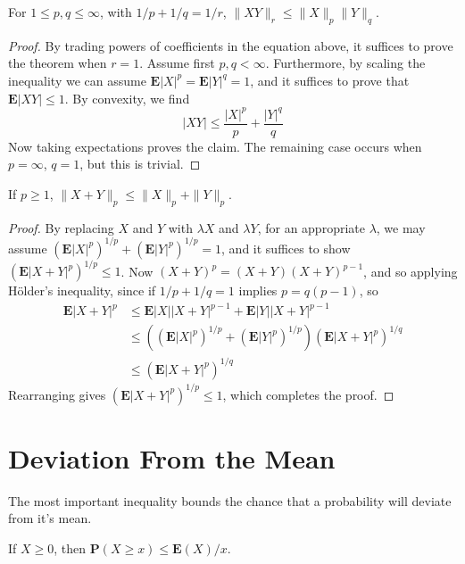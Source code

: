 \begin{corollary}
    For $1 \leq p,q \leq \infty$, with $1/p + 1/q = 1/r$, $\| XY \|_r \leq \| X \|_p \| Y \|_q$.
\end{corollary}
\begin{proof}
    By trading powers of coefficients in the equation above, it suffices to prove the theorem when $r = 1$. Assume first $p,q < \infty$. Furthermore, by scaling the inequality we can assume $\mathbf{E}|X|^p = \mathbf{E}|Y|^q = 1$, and it suffices to prove that $\mathbf{E}|XY| \leq 1$. By convexity, we find
    \[ |XY| \leq \frac{|X|^p}{p} + \frac{|Y|^q}{q} \]
    Now taking expectations proves the claim. The remaining case occurs when $p = \infty$, $q = 1$, but this is trivial.
\end{proof}

\begin{corollary}
    If $p \geq 1$, $\|X+Y\|_p \leq \|X\|_p + \|Y\|_p$.
\end{corollary}
\begin{proof}
    By replacing $X$ and $Y$ with $\lambda X$ and $\lambda Y$, for an appropriate $\lambda$, we may assume $(\mathbf{E} |X|^p)^{1/p} + (\mathbf{E} |Y|^p)^{1/p} = 1$, and it suffices to show $(\mathbf{E} |X+Y|^p)^{1/p} \leq 1$. Now $(X+Y)^p = (X+Y) (X+Y)^{p-1}$, and so applying H\"{o}lder's inequality, since if $1/p + 1/q = 1$ implies $p = q(p-1)$, so
    \begin{align*}
        \mathbf{E} |X+Y|^p &\leq \mathbf{E} |X||X+Y|^{p-1} + \mathbf{E} |Y||X+Y|^{p-1}\\
        &\leq ((\mathbf{E} |X|^p)^{1/p} + (\mathbf{E} |Y|^p)^{1/p}) (\mathbf{E} |X+Y|^{p})^{1/q}\\
        &\leq (\mathbf{E}|X+Y|^p)^{1/q}
    \end{align*}
    Rearranging gives $(\mathbf{E} |X+Y|^p)^{1/p} \leq 1$, which completes the proof.
\end{proof}

\section{Deviation From the Mean}

The most important inequality bounds the chance that a probability will deviate from it's mean.

\begin{theorem}
    If $X \geq 0$, then $\mathbf{P}(X \geq x) \leq \mathbf{E}(X) / x$.
\end{theorem}


